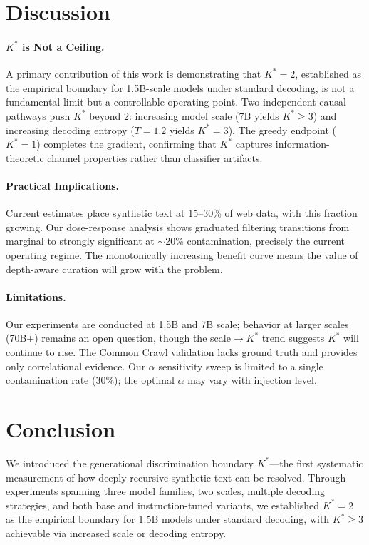 \documentclass[11pt,a4paper]{article}
\begin{document}
\section{Discussion}

\paragraph{$K^*$ is Not a Ceiling.}
A primary contribution of this work is demonstrating that $K^*=2$, established as the empirical boundary for 1.5B-scale models under standard decoding, is not a fundamental limit but a controllable operating point.
Two independent causal pathways push $K^*$ beyond 2: increasing model scale (7B yields $K^* \geq 3$) and increasing decoding entropy ($T=1.2$ yields $K^*=3$).
The greedy endpoint ($K^*=1$) completes the gradient, confirming that $K^*$ captures information-theoretic channel properties rather than classifier artifacts.

\paragraph{Practical Implications.}
Current estimates place synthetic text at 15--30\% of web data, with this fraction growing.
Our dose-response analysis shows graduated filtering transitions from marginal to strongly significant at $\sim$20\% contamination, precisely the current operating regime.
The monotonically increasing benefit curve means the value of depth-aware curation will grow with the problem.

\paragraph{Limitations.}
Our experiments are conducted at 1.5B and 7B scale; behavior at larger scales (70B+) remains an open question, though the scale$\to K^*$ trend suggests $K^*$ will continue to rise.
The Common Crawl validation lacks ground truth and provides only correlational evidence.
Our $\alpha$ sensitivity sweep is limited to a single contamination rate (30\%); the optimal $\alpha$ may vary with injection level.

\section{Conclusion}

We introduced the generational discrimination boundary $K^*$---the first systematic measurement of how deeply recursive synthetic text can be resolved.
Through experiments spanning three model families, two scales, multiple decoding strategies, and both base and instruction-tuned variants, we established $K^*=2$ as the empirical boundary for 1.5B models under standard decoding, with $K^*\geq 3$ achievable via increased scale or decoding entropy.
\end{document}
